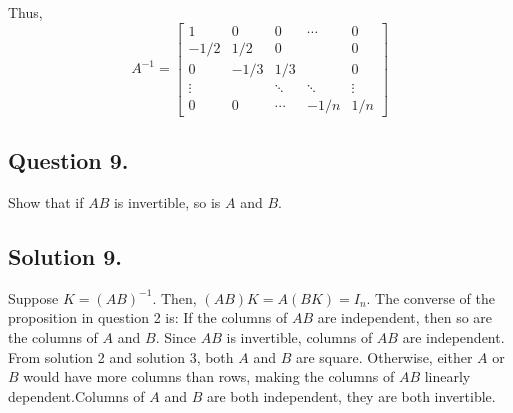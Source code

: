 \documentclass{article}
\begin{document}
Thus,
\[A^{-1}=\left[\begin{array}{ccccc}1&0&0&\cdots&0\\-1/2&1/2&0&&0\\0&-1/3&1/3&&0\\\vdots&&\ddots&\ddots&\vdots\\0&0&\cdots&-1/n&1/n\end{array}\right]\]
\subsection*{Question 9.}
Show that if $AB$ is invertible, so is $A$ and $B$.
\subsection*{Solution 9.}
Suppose $K=(AB)^{-1}$. Then, $(AB)K=A(BK)=I_n$. The converse of the proposition in question 2 is: If the columns of $AB$ are independent, then so are the columns of $A$ and $B$. Since $AB$ is invertible, columns of $AB$ are independent. From solution 2 and solution 3, both $A$ and $B$ are square. Otherwise, either $A$ or $B$ would have more columns than rows, making the columns of $AB$ linearly dependent.Columns of $A$ and $B$ are both independent, they are both invertible.
\end{document}
